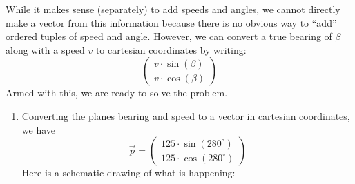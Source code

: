 \documentclass{ximera}
\begin{document}
\begin{example}[Navigation]
\begin{explanation}
While it makes sense (separately) to add speeds and angles, we cannot
directly make a vector from this information because there is no
obvious way to ``add'' ordered tuples of speed and angle. However, we
can convert a true bearing of $\beta$ along with a speed $v$ to
cartesian coordinates by writing:
\[
\begin{pmatrix}v\cdot \sin(\beta)\\ v \cdot \cos(\beta)\end{pmatrix}
\]
Armed with this, we are ready to solve the problem.
\begin{enumerate}
\item  Converting the planes bearing and speed to a vector in cartesian
  coordinates, we have
  \[
  \vec{p} = \begin{pmatrix}125\cdot \sin(280^\circ)\\ 125 \cdot \cos(280^\circ)\end{pmatrix}
  \]
  Here is a schematic drawing of what is happening:

  \begin{center}
  \end{center}




\end{enumerate}
\end{explanation}
\end{example}
\end{document}
